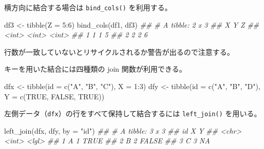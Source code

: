 \documentclass[
  letterpaper,
  xelatex,
  ja=standard, xelatex]{bxjsbook}
\newenvironment{Shaded}{\begin{snugshade}}{\end{snugshade}}
\newcommand{\AttributeTok}[1]{\textcolor[rgb]{0.40,0.45,0.13}{#1}}
\newcommand{\ConstantTok}[1]{\textcolor[rgb]{0.56,0.35,0.01}{#1}}
\newcommand{\DecValTok}[1]{\textcolor[rgb]{0.68,0.00,0.00}{#1}}
\newcommand{\DocumentationTok}[1]{\textcolor[rgb]{0.37,0.37,0.37}{\textit{#1}}}
\newcommand{\FunctionTok}[1]{\textcolor[rgb]{0.28,0.35,0.67}{#1}}
\newcommand{\NormalTok}[1]{\textcolor[rgb]{0.00,0.23,0.31}{#1}}
\newcommand{\OtherTok}[1]{\textcolor[rgb]{0.00,0.23,0.31}{#1}}
\newcommand{\SpecialCharTok}[1]{\textcolor[rgb]{0.37,0.37,0.37}{#1}}
\newcommand{\StringTok}[1]{\textcolor[rgb]{0.13,0.47,0.30}{#1}}
\begin{document}
横方向に結合する場合は \texttt{bind\_cols()} を利用する。

\begin{Shaded}
\begin{Highlighting}[]
\NormalTok{df3 }\OtherTok{\textless{}{-}} \FunctionTok{tibble}\NormalTok{(}\AttributeTok{Z =} \DecValTok{5}\SpecialCharTok{:}\DecValTok{6}\NormalTok{)}
\FunctionTok{bind\_cols}\NormalTok{(df1, df3)}
\DocumentationTok{\#\# \# A tibble: 2 x 3}
\DocumentationTok{\#\#       X     Y     Z}
\DocumentationTok{\#\#   \textless{}int\textgreater{} \textless{}int\textgreater{} \textless{}int\textgreater{}}
\DocumentationTok{\#\# 1     1     1     5}
\DocumentationTok{\#\# 2     2     2     6}
\end{Highlighting}
\end{Shaded}

行数が一致していないとリサイクルされるか警告が出るので注意する。

キーを用いた結合には四種類の join 関数が利用できる。

\begin{Shaded}
\begin{Highlighting}[]
\NormalTok{dfx }\OtherTok{\textless{}{-}} \FunctionTok{tibble}\NormalTok{(}\AttributeTok{id =} \FunctionTok{c}\NormalTok{(}\StringTok{"A"}\NormalTok{, }\StringTok{"B"}\NormalTok{, }\StringTok{"C"}\NormalTok{), }\AttributeTok{X =} \DecValTok{1}\SpecialCharTok{:}\DecValTok{3}\NormalTok{)}
\NormalTok{dfy }\OtherTok{\textless{}{-}} \FunctionTok{tibble}\NormalTok{(}\AttributeTok{id =} \FunctionTok{c}\NormalTok{(}\StringTok{"A"}\NormalTok{, }\StringTok{"B"}\NormalTok{, }\StringTok{"D"}\NormalTok{), }\AttributeTok{Y =} \FunctionTok{c}\NormalTok{(}\ConstantTok{TRUE}\NormalTok{, }\ConstantTok{FALSE}\NormalTok{, }\ConstantTok{TRUE}\NormalTok{))}
\end{Highlighting}
\end{Shaded}

左側データ（\texttt{dfx}）の行をすべて保持して結合するには
\texttt{left\_join()} を用いる。

\begin{Shaded}
\begin{Highlighting}[]
\FunctionTok{left\_join}\NormalTok{(dfx, dfy, }\AttributeTok{by =} \StringTok{"id"}\NormalTok{)}
\DocumentationTok{\#\# \# A tibble: 3 x 3}
\DocumentationTok{\#\#   id        X Y    }
\DocumentationTok{\#\#   \textless{}chr\textgreater{} \textless{}int\textgreater{} \textless{}lgl\textgreater{}}
\DocumentationTok{\#\# 1 A         1 TRUE }
\DocumentationTok{\#\# 2 B         2 FALSE}
\DocumentationTok{\#\# 3 C         3 NA}
\end{Highlighting}
\end{Shaded}
\end{document}
